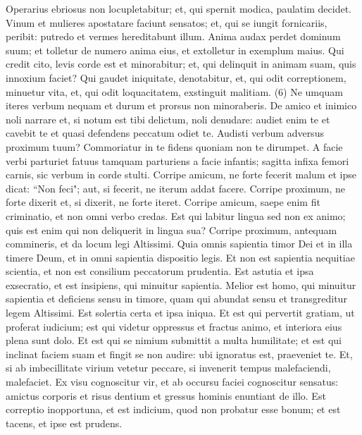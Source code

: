 \begin{biblechapter}  
\verse Operarius ebriosus non locupletabitur; et, qui spernit modica, paulatim decidet. 
\verse Vinum et mulieres apostatare faciunt sensatos; et, qui se iungit fornicariis, peribit: putredo et vermes hereditabunt illum. 
\verse Anima audax perdet dominum suum; et tolletur de numero anima eius, et extolletur in exemplum maius. 
\verse Qui credit cito, levis corde est et minorabitur; et, qui delinquit in animam suam, quis innoxium faciet? 
\verse Qui gaudet iniquitate, denotabitur, et, qui odit correptionem, minuetur vita, et, qui odit loquacitatem, exstinguit malitiam. (6) 
\verse Ne umquam iteres verbum nequam et durum et prorsus non minoraberis. 
\verse De amico et inimico noli narrare et, si notum est tibi delictum, noli denudare: 
\verse audiet enim te et cavebit te et quasi defendens peccatum odiet te. 
\verse Audisti verbum adversus proximum tuum? Commoriatur in te fidens quoniam non te dirumpet. 
\verse A facie verbi parturiet fatuus tamquam parturiens a facie infantis; 
\verse sagitta infixa femori carnis, sic verbum in corde stulti. 
\verse Corripe amicum, ne forte fecerit malum et ipse dicat: “Non feci"; aut, si fecerit, ne iterum addat facere. 
\verse Corripe proximum, ne forte dixerit et, si dixerit, ne forte iteret. 
\verse Corripe amicum, saepe enim fit criminatio, 
\verse et non omni verbo credas. Est qui labitur lingua sed non ex animo; 
\verse quis est enim qui non deliquerit in lingua sua? Corripe proximum, antequam commineris, 
\verse et da locum legi Altissimi. Quia omnis sapientia timor Dei et in illa timere Deum, et in omni sapientia dispositio legis. 
\verse Et non est sapientia nequitiae scientia, et non est consilium peccatorum prudentia. 
\verse Est astutia et ipsa exsecratio, et est insipiens, qui minuitur sapientia. 
\verse Melior est homo, qui minuitur sapientia et deficiens sensu in timore, quam qui abundat sensu et transgreditur legem Altissimi. 
\verse Est solertia certa et ipsa iniqua. 
\verse Et est qui pervertit gratiam, ut proferat iudicium; est qui videtur oppressus et fractus animo, et interiora eius plena sunt dolo. 
\verse Et est qui se nimium submittit a multa humilitate; et est qui inclinat faciem suam et fingit se non audire: ubi ignoratus est, praeveniet te. 
\verse Et, si ab imbecillitate virium vetetur peccare, si invenerit tempus malefaciendi, malefaciet. 
\verse Ex visu cognoscitur vir, et ab occursu faciei cognoscitur sensatus: 
\verse amictus corporis et risus dentium et gressus hominis enuntiant de illo. 
\verse Est correptio inopportuna, et est indicium, quod non probatur esse bonum; et est tacens, et ipse est prudens. 
\end{biblechapter}

